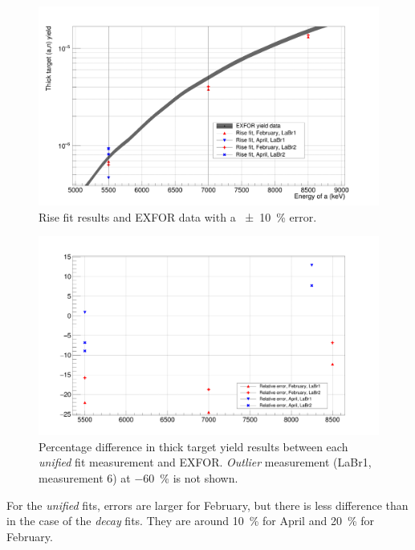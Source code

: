 \documentclass[a4paper,12pt]{report}
\begin{document}
\begin{figure}[H]
	\centering
	\includegraphics[width=\textwidth]{reactions_v_energy_rise.png}
	\caption{Rise fit results and EXFOR data with a \qty{\pm 10}{\percent} error.}
	\label{reactions_v_energy_rise}
\end{figure}

\begin{figure}[H]
	\centering
	\includegraphics[width=\textwidth]{unified_errors_per.png}
	\caption{Percentage difference in thick target yield results between each \textit{unified} fit measurement and EXFOR.
	\textit{Outlier} measurement (LaBr1, measurement 6) at \qty{-60}{\percent} is not shown.}
	\label{unified_errors_per}
\end{figure}

For the \textit{unified} fits, errors are larger for February, but there is less difference than in the case of the \textit{decay} fits.
They are around \qty{10}{\percent} for April and \qty{20}{\percent} for February.
\end{document}
